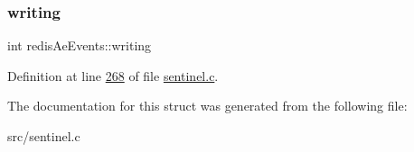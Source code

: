 \subsubsection{\texorpdfstring{writing}{writing}}
{\footnotesize\ttfamily int redis\+Ae\+Events\+::writing}



Definition at line \hyperlink{sentinel_8c_source_l00268}{268} of file \hyperlink{sentinel_8c_source}{sentinel.\+c}.



The documentation for this struct was generated from the following file\+:\begin{DoxyCompactItemize}
\item 
src/sentinel.\+c\end{DoxyCompactItemize}
